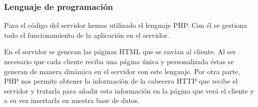 \subsubsection{Lenguaje de programación}
Para el código del servidor hemos utilizado el lenguaje PHP. Con él se gestiona todo el funcionamiento de la aplicación en el servidor.\par
En el servidor se generan las páginas HTML que se envían al cliente. Al ser necesario que cada cliente reciba una página única y personalizada éstas se generan de manera dinámica en el servidor con este lenguaje. Por otra parte, PHP nos permite obtener la información de la cabecera HTTP que recibe el servidor y tratarla para añadir esta información en la página que verá el cliente y a su vez insertarla en nuestra base de datos.\par
\newpage
